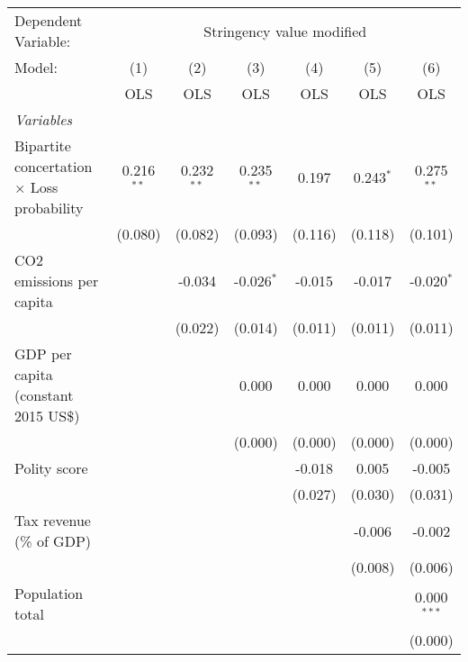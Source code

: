 
\begingroup
\centering
\begin{tabular}{lcccccc}
   \toprule
   Dependent Variable: & \multicolumn{6}{c}{Stringency value modified}\\
   Model:                                            & (1)          & (2)          & (3)          & (4)     & (5)         & (6)\\  
                                                     &  OLS         & OLS          & OLS          & OLS     & OLS         & OLS\\  
   \midrule
   \emph{Variables}\\
   Bipartite concertation $\times$ Loss probability  & 0.216$^{**}$ & 0.232$^{**}$ & 0.235$^{**}$ & 0.197   & 0.243$^{*}$ & 0.275$^{**}$\\   
                                                     & (0.080)      & (0.082)      & (0.093)      & (0.116) & (0.118)     & (0.101)\\   
   CO2 emissions per capita                          &              & -0.034       & -0.026$^{*}$ & -0.015  & -0.017      & -0.020$^{*}$\\   
                                                     &              & (0.022)      & (0.014)      & (0.011) & (0.011)     & (0.011)\\   
   GDP per capita (constant 2015 US\$)               &              &              & 0.000        & 0.000   & 0.000       & 0.000\\   
                                                     &              &              & (0.000)      & (0.000) & (0.000)     & (0.000)\\   
   Polity score                                      &              &              &              & -0.018  & 0.005       & -0.005\\   
                                                     &              &              &              & (0.027) & (0.030)     & (0.031)\\   
   Tax revenue (\% of GDP)                           &              &              &              &         & -0.006      & -0.002\\   
                                                     &              &              &              &         & (0.008)     & (0.006)\\   
   Population total                                  &              &              &              &         &             & 0.000$^{***}$\\   
                                                     &              &              &              &         &             & (0.000)\\   

\end{tabular}
